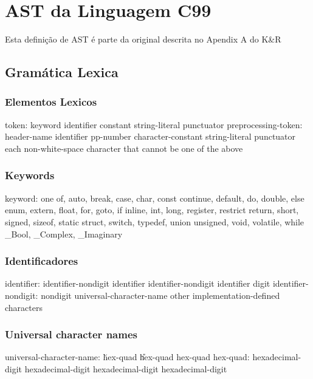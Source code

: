 \chapter{AST da Linguagem \textrm{C99}}\label{chap:ast}
\minitoc
Esta definição de AST é parte da original descrita no Apendix A do K\&R~\cite{primes}
\section{Gramática Lexica}
\subsection{Elementos Lexicos}

\begin{code_files}
token:
	keyword
	identifier
	constant
	string-literal
	punctuator
preprocessing-token:
	header-name
	identifier
	pp-number
	character-constant
	string-literal
	punctuator
	each non-white-space character that cannot be one of the above
\end{code_files}

\subsection{Keywords}
\begin{code_files}
keyword:
	one of, auto, break, case, char, const
	continue, default, do, double, else
	enum, extern, float, for, goto, if
	inline, int, long, register, restrict
	return, short, signed, sizeof, static
	struct, switch, typedef, union
	unsigned, void, volatile, while
	_Bool, _Complex, _Imaginary
\end{code_files}

\subsection{Identificadores}
\begin{code_files}
identifier:
	identifier-nondigit
	identifier identifier-nondigit
	identifier digit
identifier-nondigit:
	nondigit
	universal-character-name
	other implementation-defined characters
\end{code_files}

\subsection{Universal character names}
\begin{code_files}
universal-character-name:
	\u hex-quad
	\U hex-quad hex-quad
hex-quad:
	hexadecimal-digit hexadecimal-digit
	hexadecimal-digit hexadecimal-digit
\end{code_files}

